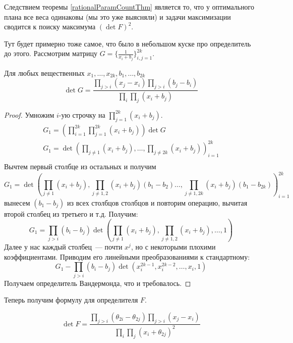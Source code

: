 Следствием теоремы \eqref{rationalParamCountThm} является то, что у оптимального плана все веса одинаковы (мы это уже выясняли) и задачи максимизации сводится к поиску максимума $(\det F)^2$.

{\color{blue} Тут будет примерно тоже самое, что было в небольшом куске про определитель до этого.}
Рассмотрим матрицу $G = \{ \frac{1}{x_i + b_j}\}_{i,j = 1}^{2k}$. 
\begin{thm}
Для любых вещественных $x_1, …, x_{2k}, b_1,…, b_{2k}$
$$\det G = \frac{\prod\limits_{j>i} (x_j-x_i) \prod\limits_{j>i}(b_j - b_i)}{\prod\limits_i\prod\limits_j (x_i + b_j)}$$
\end{thm}
\begin{proof}
Умножим $i$-ую строчку на $\prod\limits_{j=1}^{2k}(x_i+b_j)$. 
\begin{equation}
\begin{split}
G_1 = (\prod\limits_{i=1}^{2k}\prod\limits_{j=1}^{2k}(x_i+b_j)) \det G \\
G_1 = \det\left( \prod\limits_{j\neq 1} (x_i+b_j), …, \prod\limits_{j\neq 2k} (x_i+b_j)\right)_{i=1}^{2k}\\
\end{split}
\end{equation}
Вычтем первый столбце из остальных и получим
$$G_1 = \det\left( \prod\limits_{j\neq 1} (x_i+b_j),\prod\limits_{j\neq 1,2} (x_i+b_j) (b_1 - b_2) …, \prod\limits_{j\neq 1, 2k} (x_i+b_j) (b_{1} - b_{2k})\right)_{i=1}^{2k}$$
вынесем $(b_1-b_j)$ из всех столбцов столбцов и повторим операцию, вычитая второй столбец из третьего и т.д. Получим:
$$G_1 = \prod\limits_{j>i}(b_i - b_j) \det \left(\prod_{j\neq 1}(x_i + b_j), \prod\limits_{j\neq 1,2}(x_i+b_j),…,1\right)$$ 
Далее у нас каждый столбец — почти $x^j$, но с некоторыми плохими коэффициентами. Приводим его линейными преобразованиями к стандартному:
$$G_1 - \prod \limits_{j>i}(b_i - b_j) \det(x_i^{2k-1}, x_i^{2k-2},…, x_i,1)$$
Получаем определитель Вандермонда, что и требовалось.
\end{proof}

Теперь получим формулу для определителя $F$.
\begin{thm}
\begin{equation}
\label{detEquatin}
\det F = \frac{\prod\limits_{j>i}(\theta_{2i}-\theta_{2j})\prod\limits_{j>i}(x_j - x_i)}{\prod\limits_i\prod\limits_j (x_i + \theta_{2j})^2}
\end{equation}
\end{thm}

